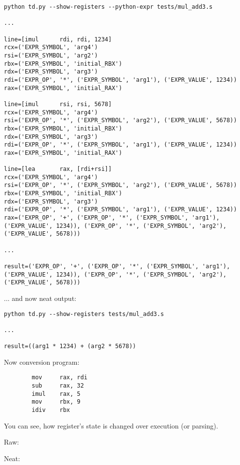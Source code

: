 ﻿\documentclass[12pt]{article}
\begin{document}
\begin{lstlisting}
python td.py --show-registers --python-expr tests/mul_add3.s

...

line=[imul      rdi, rdi, 1234]
rcx=('EXPR_SYMBOL', 'arg4')
rsi=('EXPR_SYMBOL', 'arg2')
rbx=('EXPR_SYMBOL', 'initial_RBX')
rdx=('EXPR_SYMBOL', 'arg3')
rdi=('EXPR_OP', '*', ('EXPR_SYMBOL', 'arg1'), ('EXPR_VALUE', 1234))
rax=('EXPR_SYMBOL', 'initial_RAX')

line=[imul      rsi, rsi, 5678]
rcx=('EXPR_SYMBOL', 'arg4')
rsi=('EXPR_OP', '*', ('EXPR_SYMBOL', 'arg2'), ('EXPR_VALUE', 5678))
rbx=('EXPR_SYMBOL', 'initial_RBX')
rdx=('EXPR_SYMBOL', 'arg3')
rdi=('EXPR_OP', '*', ('EXPR_SYMBOL', 'arg1'), ('EXPR_VALUE', 1234))
rax=('EXPR_SYMBOL', 'initial_RAX')

line=[lea       rax, [rdi+rsi]]
rcx=('EXPR_SYMBOL', 'arg4')
rsi=('EXPR_OP', '*', ('EXPR_SYMBOL', 'arg2'), ('EXPR_VALUE', 5678))
rbx=('EXPR_SYMBOL', 'initial_RBX')
rdx=('EXPR_SYMBOL', 'arg3')
rdi=('EXPR_OP', '*', ('EXPR_SYMBOL', 'arg1'), ('EXPR_VALUE', 1234))
rax=('EXPR_OP', '+', ('EXPR_OP', '*', ('EXPR_SYMBOL', 'arg1'), ('EXPR_VALUE', 1234)), ('EXPR_OP', '*', ('EXPR_SYMBOL', 'arg2'), ('EXPR_VALUE', 5678)))

...

result=('EXPR_OP', '+', ('EXPR_OP', '*', ('EXPR_SYMBOL', 'arg1'), ('EXPR_VALUE', 1234)), ('EXPR_OP', '*', ('EXPR_SYMBOL', 'arg2'), ('EXPR_VALUE', 5678)))
\end{lstlisting}

... and now neat output:

\begin{lstlisting}
python td.py --show-registers tests/mul_add3.s

...

result=((arg1 * 1234) + (arg2 * 5678))
\end{lstlisting}

Now conversion program:

\begin{lstlisting}
        mov     rax, rdi
        sub     rax, 32
        imul    rax, 5
        mov     rbx, 9
        idiv    rbx
\end{lstlisting}

You can see, how register's state is changed over execution (or parsing).

Raw:



Neat:


\end{document}
